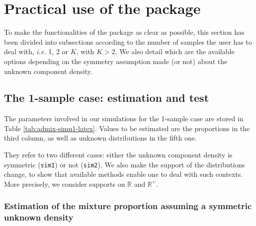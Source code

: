 \section{Practical use of the package}\label{sec:practicalUse}

To make the functionalities of the package as clear as possible, this section has been divided into subsections according to the number of samples the user has to deal with, \emph{i.e.} 1, 2 or \(K\), with \(K > 2\).
We also detail which are the available options depending on the symmetry assumption made (or not) about the unknown component density.

\subsection{The 1-sample case: estimation and test}\label{sec:1sample}

The parameters involved in our simulations for the 1-sample case are stored in Table \ref{tab:admix-simu1-latex}. Values to be estimated are the proportions in the third column, as well as unknown distributions in the fifth one.

\begin{table}[!h]
\centering
\caption{\label{tab:admix-simu1-latex}Simulation parameters in the 1-sample case, with Gaussian-Exponential mixtures.}
\centering
{}
\end{table}

They refer to two different cases: either the unknown component density is symmetric (\texttt{sim1}) or not (\texttt{sim2}). We also make the support of the distributions change, to show that available methods enable one to deal with such contexts. More precisely, we consider supports on \(\mathbb{R}\) and \(\mathbb{R}^+\).

\subsubsection{Estimation of the mixture proportion assuming a symmetric unknown density}\label{estimation-of-the-mixture-proportion-assuming-a-symmetric-unknown-density}

